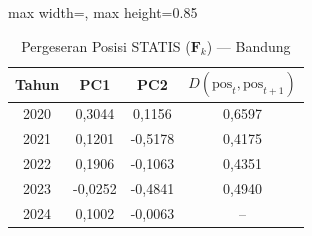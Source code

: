 \begin{table}[H]
\centering
\caption{Pergeseran Posisi STATIS ($\mathbf{F}_k$) --- Bandung} \label{tab:app1jarak_statis_skor_bandung}
\begin{adjustbox}{max width=\textwidth, max height=0.85\textheight}
\begin{tabular}{|c|c|c|c|}
\hline
\textbf{Tahun} & \textbf{PC1} & \textbf{PC2} & \textbf{$D(\text{pos}_t, \text{pos}_{t+1})$} \\
\hline
2020 & 0,3044 & 0,1156 & 0,6597 \\
2021 & 0,1201 & -0,5178 & 0,4175 \\
2022 & 0,1906 & -0,1063 & 0,4351 \\
2023 & -0,0252 & -0,4841 & 0,4940 \\
2024 & 0,1002 & -0,0063 & -- \\
\hline
\end{tabular}
\end{adjustbox}
\end{table}